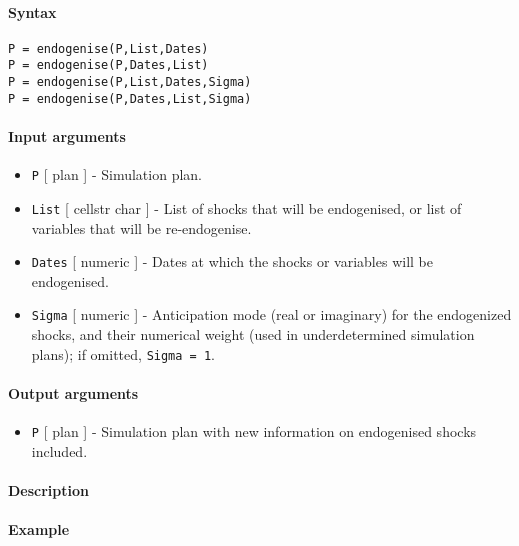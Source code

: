 


	\paragraph{Syntax}\label{syntax}

\begin{verbatim}
P = endogenise(P,List,Dates)
P = endogenise(P,Dates,List)
P = endogenise(P,List,Dates,Sigma)
P = endogenise(P,Dates,List,Sigma)
\end{verbatim}

\paragraph{Input arguments}\label{input-arguments}

\begin{itemize}
\item
  \texttt{P} {[} plan {]} - Simulation plan.
\item
  \texttt{List} {[} cellstr \textbar{} char {]} - List of shocks that
  will be endogenised, or list of variables that will be re-endogenise.
\item
  \texttt{Dates} {[} numeric {]} - Dates at which the shocks or
  variables will be endogenised.
\item
  \texttt{Sigma} {[} numeric {]} - Anticipation mode (real or imaginary)
  for the endogenized shocks, and their numerical weight (used in
  underdetermined simulation plans); if omitted, \texttt{Sigma = 1}.
\end{itemize}

\paragraph{Output arguments}\label{output-arguments}

\begin{itemize}
\itemsep1pt\parskip0pt
\item
  \texttt{P} {[} plan {]} - Simulation plan with new information on
  endogenised shocks included.
\end{itemize}

\paragraph{Description}\label{description}

\paragraph{Example}\label{example}


